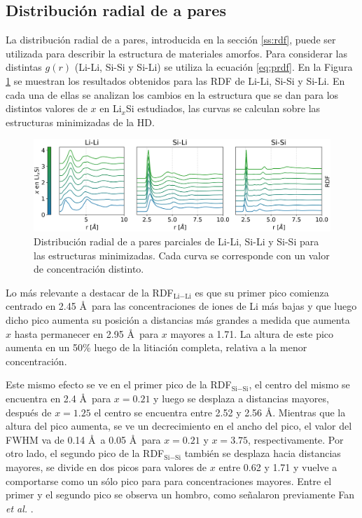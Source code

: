 \subsection{Distribución radial de a pares}

La distribución radial de a pares, introducida en la sección \ref{ss:rdf},
puede ser utilizada para describir la estructura de materiales amorfos. Para 
considerar las distintas $g(r)$ (Li-Li, Si-Si y Si-Li) se utiliza la 
ecuación \ref{eq:prdf}. En la Figura \ref{fig:rdf} se muestran los resultados 
obtenidos para las RDF de Li-Li, Si-Si y Si-Li. En cada una de ellas se analizan
los cambios en la estructura que se dan para los distintos valores de $x$ en 
Li$_x$Si estudiados, las curvas se calculan sobre las estructuras minimizadas 
de la HD.
\begin{figure}[h!]
    \centering
    \includegraphics[width=\textwidth]{Silicio/caracterizacion/resultados/rdf/rdf.png}
    \caption{Distribución radial de a pares parciales de Li-Li, Si-Li y Si-Si 
    para las estructuras minimizadas. Cada curva se corresponde con un valor de 
    concentración distinto.}
    \label{fig:rdf}
\end{figure}

Lo más relevante a destacar de la RDF$_{\text{Li}-\text{Li}}$ es que su primer 
pico comienza 
centrado en 2.45 \AA\ para las concentraciones de iones de Li más bajas y que 
luego dicho pico aumenta su posición a distancias más grandes a medida que aumenta
$x$ hasta permanecer en 2.95 \AA\ para $x$ mayores a 1.71. La altura de este pico
aumenta en un 50\% luego de la litiación completa, relativa a la menor 
concentración.

Este mismo efecto se ve en el primer pico de la RDF$_{\text{Si}-\text{Si}}$, el 
centro del mismo
se encuentra en 2.4 \AA\ para $x = 0.21$ y luego se desplaza a distancias
mayores, después de $x = 1.25$ el centro se encuentra entre 2.52 y 2.56 \AA.
Mientras que la altura del pico aumenta, se ve un decrecimiento en el ancho 
del pico, el valor del FWHM va de 0.14 \AA\ a 0.05 \AA\ para $x = 0.21$ y 
$x = 3.75$, respectivamente. Por otro lado, el segundo pico de la RDF$_{\text{Si}-\text{Si}}$
también se desplaza hacia distancias mayores, se divide en dos picos para valores 
de $x$ entre 0.62 y 1.71 y vuelve a comportarse como un sólo pico para para 
concentraciones mayores. Entre el primer y el segundo pico se observa un hombro,
como señalaron previamente Fan \textit{et al.} \cite{fan2013}.%

